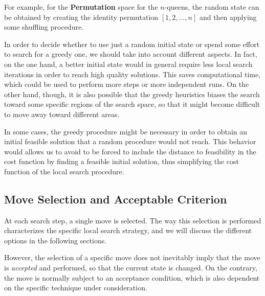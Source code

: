 For example, for the \textbf{Permutation} space for the $n$-queens, the
random state can be obtained by creating the identity permutation
$[1,2,\dots,n]$ and then applying some shuffling procedure.


In order to decide whether to use just a random initial state or spend
some effort to search for a greedy one, we should take into account
different aspects. In fact, on the one hand, a better initial state
would in general require less local search iterations in order to reach
high quality solutions. This saves computational time, which could be used
to perform more steps or more independent runs. On the other hand,
though, it is also possible that the greedy heuristics biases the
search toward some specific regions of the search space, so that it
might become difficult to move away toward different areas.

In some cases, the greedy procedure might be necessary in order to
obtain an initial feasible solution that a random procedure would not
reach. This behavior would allows us to avoid to be forced to include
the distance to feasibility in the cost function by finding a feasible
initial solution, thus simplifying the cost function of the local
search procedure.




\subsection{Move Selection and Acceptable Criterion}

At each search step, a single move is selected. The way this selection is
performed characterizes the specific local search strategy, and we
will discuss the different options in the following sections.

However, the selection of a specific move does not inevitably imply that
the move is \emph{accepted} and performed, so that the current state is changed. On
the contrary, the move is normally subject to an acceptance condition,
which is also dependent on the specific technique under consideration.

